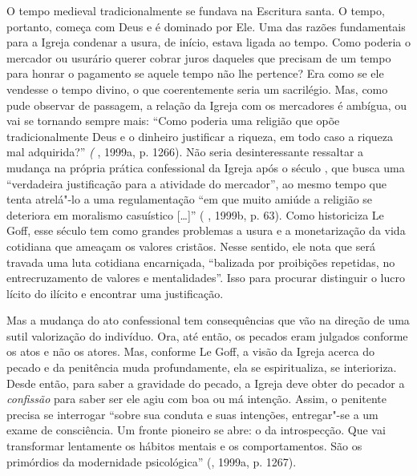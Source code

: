 O tempo medieval tradicionalmente se fundava na Escritura santa. O
tempo, portanto, começa com Deus e é dominado por Ele. Uma das razões
fundamentais para a Igreja condenar a usura, de início, estava ligada ao
tempo. Como poderia o mercador ou usurário querer cobrar juros daqueles
que precisam de um tempo para honrar o pagamento se aquele tempo não lhe
pertence? Era como se ele vendesse o tempo divino, o que coerentemente
seria um sacrilégio. Mas, como pude observar de passagem, a relação da Igreja com os
mercadores é ambígua, ou vai se tornando sempre mais: ``Como poderia uma
religião que opõe tradicionalmente Deus e o dinheiro justificar a
riqueza, em todo caso a riqueza mal adquirida?'' \emph{(} , 1999a,
p. 1266). Não seria desinteressante ressaltar a mudança na própria
prática confessional da Igreja após o século , que busca uma
``verdadeira justificação para a atividade do mercador'', ao mesmo tempo
que tenta atrelá"-lo a uma regulamentação ``em que muito amiúde a
religião se deteriora em moralismo casuístico [\ldots{}]'' (
, 1999b, p. 63). Como historiciza Le Goff, esse século tem
como grandes problemas a usura e a monetarização da vida cotidiana que
ameaçam os valores cristãos. Nesse sentido, ele nota que será travada
uma luta cotidiana encarniçada, ``balizada por proibições repetidas, no
entrecruzamento de valores e mentalidades''. Isso para procurar
distinguir o lucro lícito do ilícito e encontrar uma justificação.

Mas a mudança do ato confessional tem consequências que vão na direção
de uma sutil valorização do indivíduo. Ora, até então, os pecados eram
julgados conforme os atos e não os atores. Mas, conforme Le Goff, a
visão da Igreja acerca do pecado e da penitência muda profundamente, ela
se espiritualiza, se interioriza. Desde então, para saber a gravidade do
pecado, a Igreja deve obter do pecador a \emph{confissão} para saber ser
ele agiu com boa ou má intenção. Assim, o penitente precisa se
interrogar ``sobre sua conduta e suas intenções, entregar"-se a um exame
de consciência. Um fronte pioneiro se abre: o da introspecção. Que vai
transformar lentamente os hábitos mentais e os comportamentos. São os
primórdios da modernidade psicológica'' (, 1999a, p. 1267).

